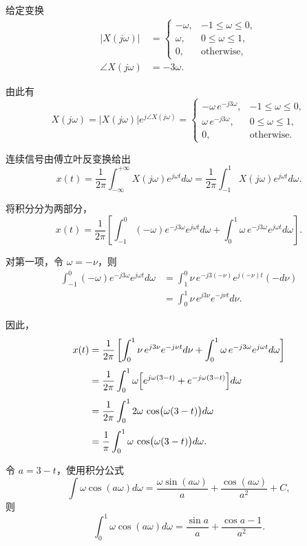 \documentclass[11pt]{article}
\begin{document}
给定变换 \[
\begin{aligned}
|X(j\omega)| &= \begin{cases}
-\omega, & -1\le \omega \le 0,\\[1mm]
\omega, & 0\le \omega \le 1,\\[1mm]
0, & \text{otherwise},
\end{cases}\\[1mm]
\angle X(j\omega) &= -3\omega.
\end{aligned}
\]

由此有 \[
X(j\omega)=|X(j\omega)|e^{j\angle X(j\omega)}
=\begin{cases}
-\omega\, e^{-j3\omega}, & -1\le \omega \le 0,\\[1mm]
\omega\, e^{-j3\omega}, & 0\le \omega \le 1,\\[1mm]
0, & \text{otherwise.}
\end{cases}
\]

连续信号由傅立叶反变换给出 \[
x(t)=\frac{1}{2\pi}\int_{-\infty}^{+\infty}X(j\omega)e^{j\omega t}d\omega
=\frac{1}{2\pi}\int_{-1}^{1}X(j\omega)e^{j\omega t}d\omega.
\]

将积分分为两部分， \[
x(t)=\frac{1}{2\pi}\left[\int_{-1}^{0}(-\omega)e^{-j3\omega}e^{j\omega t}d\omega
+\int_{0}^{1}\omega\,e^{-j3\omega}e^{j\omega t}d\omega \right].
\]

对第一项，令 \(\omega=-\nu\)，则 \[
\begin{aligned}
\int_{-1}^{0}(-\omega)e^{-j3\omega}e^{j\omega t}d\omega 
&=\int_{1}^{0}\nu\,e^{-j3(-\nu)}e^{j(-\nu)t}(-d\nu)\\[1mm]
&=\int_{0}^{1}\nu\,e^{j3\nu}e^{-j\nu t}d\nu.
\end{aligned}
\]

因此， \[
\begin{aligned}
x(t)
&=\frac{1}{2\pi}\left[\int_{0}^{1}\nu\,e^{j3\nu}e^{-j\nu t}d\nu
+\int_{0}^{1}\omega\,e^{-j3\omega}e^{j\omega t}d\omega \right]\\[1mm]
&=\frac{1}{2\pi}\int_{0}^{1}\omega\Bigl[e^{j\omega(3-t)}+e^{-j\omega(3-t)}\Bigr]d\omega\\[1mm]
&=\frac{1}{2\pi}\int_{0}^{1}2\omega\,\cos\bigl(\omega(3-t)\bigr)d\omega\\[1mm]
&=\frac{1}{\pi}\int_{0}^{1}\omega\,\cos\bigl(\omega(3-t)\bigr)d\omega.
\end{aligned}
\]

令 \(a=3-t\)，使用积分公式 \[
\int \omega\cos(a\omega)d\omega
=\frac{\omega\sin(a\omega)}{a}+\frac{\cos(a\omega)}{a^2}+C,
\] 则 \[
\int_{0}^{1}\omega\cos(a\omega)d\omega
=\frac{\sin a}{a}+\frac{\cos a-1}{a^2}.
\]
\end{document}
